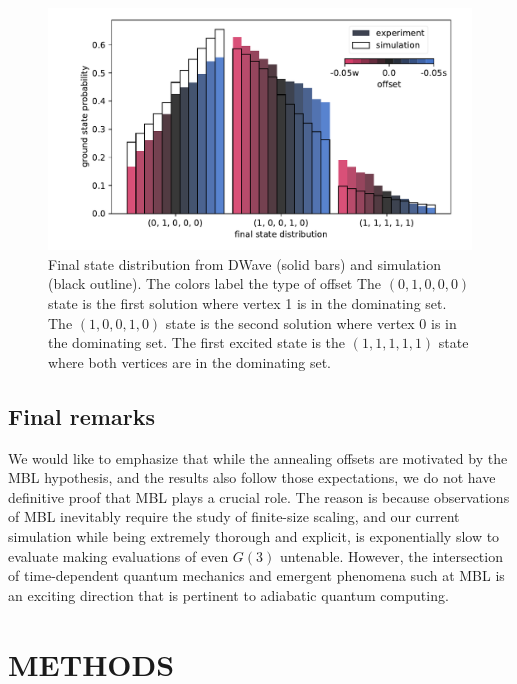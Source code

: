\documentclass[prd,twocolumn,tightenlines,preprintnumbers,showpacs,superscriptaddress,notitlepage,nofootinbib,eqsecnum,floatfix,longbibliography,aps,10pt]{revtex4-2}
\begin{document}
\begin{figure}
	\centering
	\includegraphics[width=\columnwidth]{./new_figures/final_state_distribution.pdf}
	\caption{Final state distribution from DWave (solid bars) and simulation (black outline). The colors label the type of offset  The $(0, 1, 0, 0, 0)$ state is the first solution where vertex 1 is in the dominating set. The $(1, 0, 0, 1, 0)$ state is the second solution where vertex 0 is in the dominating set. The first excited state is the $(1, 1, 1, 1, 1)$ state where both vertices are in the dominating set.}
	\label{fig:final_state_distribution}
\end{figure}


\subsection{Final remarks}
\label{sec:results:final}
We would like to emphasize that while the annealing offsets are motivated by the MBL hypothesis, and the results also follow those expectations, we do not have definitive proof that MBL plays a crucial role.
The reason is because observations of MBL inevitably require the study of finite-size scaling, and our current simulation while being extremely thorough and explicit, is exponentially slow to evaluate making evaluations of even $G(3)$ untenable.
However, the intersection of time-dependent quantum mechanics and emergent phenomena such at MBL is an exciting direction that is pertinent to adiabatic quantum computing.






\section{METHODS}
\label{sec:methods}
\end{document}
